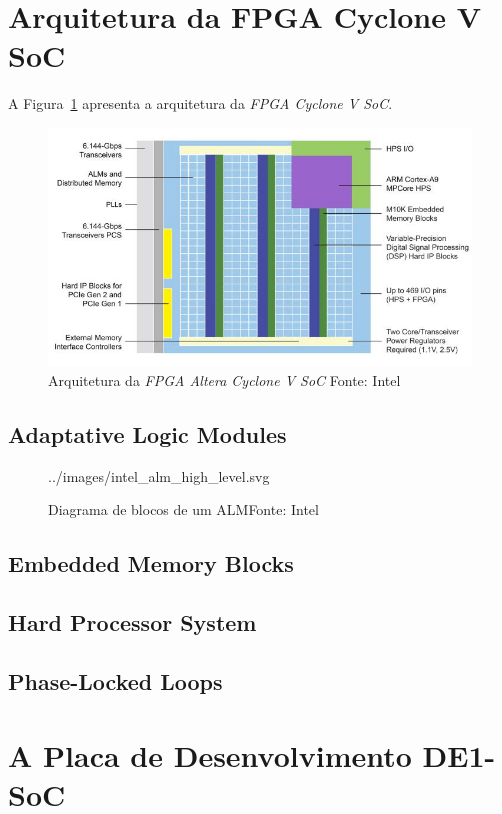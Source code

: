 \clearpage


\section{Arquitetura da FPGA Cyclone V SoC}
{
    A Figura~\ref{fig:cyclone_v_arch} apresenta a arquitetura da \textit{FPGA
    Cyclone V SoC}.
}

\begin{figure}[H]
\centering
\includegraphics[width=1\linewidth]
    {../images/altera_cyclone_v_soc_architectural_downscale.jpg}
    \caption[Arquitetura da FPGA Intel Cyclone V SoC]
        {Arquitetura da \textit{FPGA Altera Cyclone V SoC} \quad Fonte: Intel
        }\label{fig:cyclone_v_arch}
\end{figure}

    \subsection{Adaptative Logic Modules}
    {}

    \begin{figure}[H]
    \centering
    
        {../images/intel_alm_high_level.svg}
        \caption[Diagrama de blocos de um ALM]
            {Diagrama de blocos de um ALM\quad Fonte: Intel
            }\label{fig:fpga_alm}
    \end{figure}


    \subsection{Embedded Memory Blocks}
    {}

    \subsection{Hard Processor System}
    {}

    \subsection{Phase-Locked Loops}
    {}

\section{A Placa de Desenvolvimento DE1-SoC}


